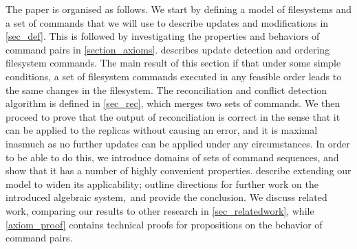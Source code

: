 The paper is organised as follows.
%
We start by defining a model of filesystems and a set of commands
that we will use to describe updates and modifications in \cref{sec_def}.
%
This is followed by investigating the properties and behaviors
of command pairs in \cref{section_axioms}.
%
 describes update detection and ordering filesystem commands.
The main result of this section if that under some simple conditions,
a set of filesystem commands executed in any feasible order leads
to the same changes in the filesystem.
%
The reconciliation and conflict detection algorithm is defined in
\cref{sec_rec}, which merges two sets of commands.
We then proceed to prove that the output of reconciliation
is correct in the sense that 
it can be applied to the replicas without causing an error,
and it is maximal
inasmuch as no further updates can be applied under any circumstances.
In order to be able to do this, we introduce
domains of sets of command sequences,
and show that it has a number of highly convenient properties.
%
describe extending our model to widen its applicability;
outline directions for further work on the introduced algebraic system,\
and provide the conclusion.
%
We discuss related work, comparing our results to other research in \cref{sec_relatedwork},
while
\cref{axiom_proof} contains technical proofs for propositions on the behavior of command pairs.

